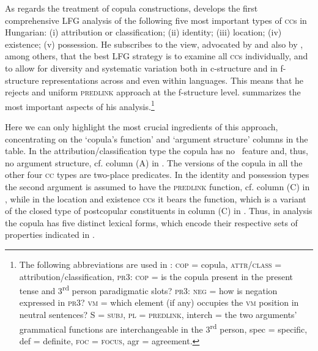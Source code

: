 \documentclass[output=paper,hidelinks]{langscibook}
\begin{document}
As regards the treatment of copula constructions, \citet{Laczko2012} develops the first comprehensive LFG analysis of the following five most important types of \textsc{cc}s in Hungarian: (i) attribution or classification; (ii) identity; (iii) location; (iv) existence; (v) possession.  He subscribes to the view, advocated by \citet{dalrympleetal04copular} and also by \citet{NordlingerSadler2007}, among others, that the best LFG strategy is to examine all \textsc{cc}s individually, and to allow for diversity and systematic variation both in c-structure and in f-structure representations across and even within languages. This means that he rejects  and  uniform \textsc{predlink} approach at the f-structure level.  summarizes the most important aspects of his analysis.\footnote{The following abbreviations are used in : \textsc{cop} = copula, \textsc{attr/class} = attribution/classification, \textsc{pr}3: \textsc{cop} = is the copula present in the present tense and 3\textsuperscript{rd} person paradigmatic slots? \textsc{pr}3: \textsc{neg} = how is negation expressed in \textsc{pr}3? \textsc{vm} = which element (if any) occupies the \textsc{vm} position in neutral sentences? S = \textsc{subj}, \textsc{pl} = \textsc{predlink}, interch = the two arguments' grammatical functions are interchangeable in the 3\textsuperscript{rd} person, spec = specific, def = definite, \textsc{foc} = \textsc{focus}, agr = agreement.}


Here we can only highlight the most crucial ingredients of this approach, concentrating on the `copula's function' and `argument structure' columns in the table. In the attribution/classification type the copula has no \PRED\ feature and, thus, no argument structure, cf. column (A) in . The versions of the copula in all the other four \textsc{cc} types are two-place predicates. In the identity and possession types the second argument is assumed to have the \textsc{predlink} function, cf. column (C) in , while in the location and existence \textsc{cc}s it bears the  function, which is a variant of the closed type of postcopular constituents in column (C) in .  Thus, in  analysis the copula has five distinct lexical forms, which encode their respective sets of properties indicated in .
\end{document}
